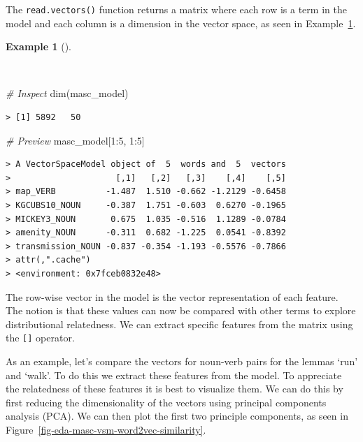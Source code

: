 \documentclass[
  letterpaper,
  DIV=11,
  numbers=noendperiod]{scrreport}
\newenvironment{Shaded}{\begin{snugshade}}{\end{snugshade}}
\newcommand{\CommentTok}[1]{\textcolor[rgb]{0.00,0.00,0.00}{\textit{#1}}}
\newcommand{\DecValTok}[1]{\textcolor[rgb]{0.00,0.00,0.00}{#1}}
\newcommand{\FunctionTok}[1]{\textcolor[rgb]{0.00,0.00,0.00}{#1}}
\newcommand{\NormalTok}[1]{\textcolor[rgb]{0.00,0.00,0.00}{#1}}
\newcommand{\SpecialCharTok}[1]{\textcolor[rgb]{0.00,0.00,0.00}{#1}}
\theoremstyle{definition}
\newtheorem{example}{Example}[chapter]
\theoremstyle{remark}
\begin{document}
The \texttt{read.vectors()} function returns a matrix where each row is
a term in the model and each column is a dimension in the vector space,
as seen in Example~\ref{exm-eda-masc-vsm-word2vec-vector-object}.

\begin{example}[]\protect\hypertarget{exm-eda-masc-vsm-word2vec-vector-object}{}\label{exm-eda-masc-vsm-word2vec-vector-object}

~

\begin{Shaded}
\begin{Highlighting}[]
\CommentTok{\# Inspect}
\FunctionTok{dim}\NormalTok{(masc\_model)}
\end{Highlighting}
\end{Shaded}

\begin{verbatim}
> [1] 5892   50
\end{verbatim}

\begin{Shaded}
\begin{Highlighting}[]
\CommentTok{\# Preview}
\NormalTok{masc\_model[}\DecValTok{1}\SpecialCharTok{:}\DecValTok{5}\NormalTok{, }\DecValTok{1}\SpecialCharTok{:}\DecValTok{5}\NormalTok{]}
\end{Highlighting}
\end{Shaded}

\begin{verbatim}
> A VectorSpaceModel object of  5  words and  5  vectors
>                     [,1]   [,2]   [,3]    [,4]    [,5]
> map_VERB          -1.487  1.510 -0.662 -1.2129 -0.6458
> KGCUBS10_NOUN     -0.387  1.751 -0.603  0.6270 -0.1965
> MICKEY3_NOUN       0.675  1.035 -0.516  1.1289 -0.0784
> amenity_NOUN      -0.311  0.682 -1.225  0.0541 -0.8392
> transmission_NOUN -0.837 -0.354 -1.193 -0.5576 -0.7866
> attr(,".cache")
> <environment: 0x7fceb0832e48>
\end{verbatim}

\end{example}

The row-wise vector in the model is the vector representation of each
feature. The notion is that these values can now be compared with other
terms to explore distributional relatedness. We can extract specific
features from the matrix using the \texttt{{[}{]}} operator.

As an example, let's compare the vectors for noun-verb pairs for the
lemmas `run' and `walk'. To do this we extract these features from the
model. To appreciate the relatedness of these features it is best to
visualize them. We can do this by first reducing the dimensionality of
the vectors using principal components analysis (PCA). We can then plot
the first two principle components, as seen in
Figure~\ref{fig-eda-masc-vsm-word2vec-similarity}.
\end{document}

